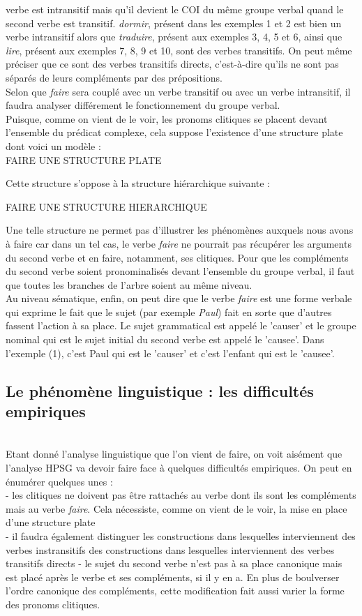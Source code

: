 	verbe est intransitif mais qu'il devient le COI du même groupe verbal quand le second verbe est transitif. \emph{dormir}, 
	présent dans les exemples 1 et 2 est bien un verbe intransitif alors que \emph{traduire}, présent aux exemples 3, 4, 5 et 6, 
	ainsi que \emph{lire}, présent aux exemples 7, 8, 9 et 10, sont des verbes transitifs. On peut même préciser que ce sont des
	verbes transitifs directs, c'est-à-dire qu'ils ne sont pas séparés de leurs compléments par des prépositions.\\
	Selon que \emph{faire} sera couplé avec un verbe transitif ou avec un verbe intransitif, il faudra analyser différement le
	fonctionnement du groupe verbal.
	\\
	Puisque, comme on vient de le voir, les pronoms clitiques se placent devant l'ensemble du prédicat complexe, cela suppose
	l'existence d'une structure plate dont voici un modèle : \\
	
	FAIRE UNE STRUCTURE PLATE
	
	Cette structure s'oppose à la structure hiérarchique suivante :
	
	FAIRE UNE STRUCTURE HIERARCHIQUE
	
	Une telle structure ne permet pas d'illustrer les phénomènes auxquels nous avons à faire car dans un tel cas, le verbe 
	\emph{faire} ne pourrait pas récupérer les arguments du second verbe et en faire, notamment, ses clitiques. Pour que 
	les compléments du second verbe soient pronominalisés devant l'ensemble du groupe verbal, il faut que toutes les branches de
	l'arbre soient au même niveau.
	\\
	Au niveau sématique, enfin, on peut dire que le verbe \emph{faire} est une forme verbale qui exprime le fait que le sujet 
	(par exemple \emph{Paul}) fait en sorte que d'autres fassent l'action à sa place. Le sujet grammatical est appelé le 'causer'
	et le groupe nominal qui est le sujet initial du second verbe est appelé le 'causee'. Dans l'exemple (1), c'est Paul qui est
	le 'causer' et c'est l'enfant qui est le 'causee'.
	\\
\subsection{Le phénomène linguistique : les difficultés empiriques}
	\\ 
	Etant donné l'analyse linguistique que l'on vient de faire, on voit aisément que l'analyse HPSG va devoir faire face à 
	quelques difficultés empiriques. On peut en énumérer quelques unes :\\
	- les clitiques ne doivent pas être rattachés au verbe dont ils sont les compléments mais au verbe \emph{faire}. Cela 
	nécessiste, comme on vient de le voir, la mise en place d'une structure plate\\
	- il faudra également distinguer les constructions dans lesquelles interviennent des verbes instransitifs des constructions 
	dans lesquelles interviennent des verbes transitifs directs
	- le sujet du second verbe n'est pas à sa place canonique mais est placé après le verbe et ses compléments, si il y en a.
	En plus de boulverser l'ordre canonique des compléments, cette modification fait aussi varier la forme des pronoms 
	clitiques.\
	\\
